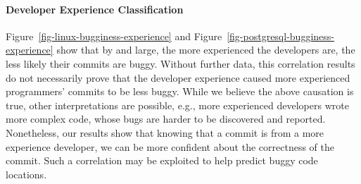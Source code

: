 


\paragraph{Developer Experience Classification}

Figure~\ref{fig-linux-bugginess-experience} and Figure~\ref{fig-postgresql-bugginess-experience} 
show that by and large, the more experienced the developers are, the less likely their commits are buggy.
Without further data, this correlation results do not necessarily prove that the developer experience caused more 
experienced programmers' commits to be less buggy. 
While we believe the above causation is true, other interpretations are possible, e.g., more experienced developers wrote 
more complex code, whose bugs are harder to be discovered and reported. 
Nonetheless, our results show that knowing that a commit is from a more experience developer, we can 
be more confident about the correctness of the commit. Such a correlation may be exploited 
to help predict buggy code locations.




